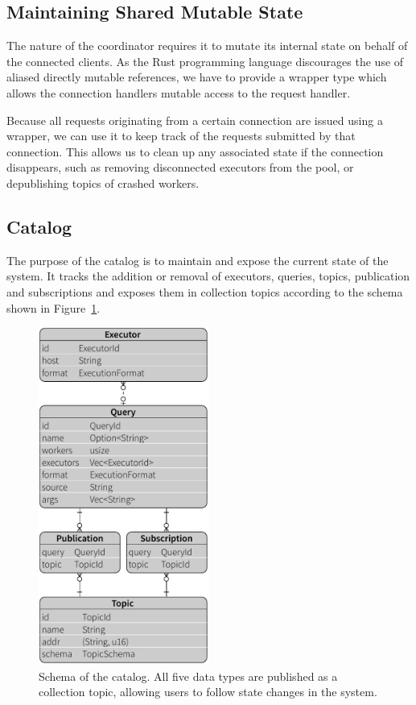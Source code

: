 \subsection{Maintaining Shared Mutable State}

The nature of the coordinator requires it to mutate its internal state on
behalf of the connected clients. As the Rust programming language discourages
the use of aliased directly mutable references, we have to provide a wrapper
type which allows the connection handlers mutable access to the request handler.

Because all requests originating from a certain connection are issued using a
wrapper, we can use it to keep track of the requests submitted by that connection.
This allows us to clean up any associated state if the connection disappears,
such as removing disconnected executors from the pool, or depublishing 
topics of crashed workers.

\subsection{Catalog}

The purpose of the catalog is to maintain and expose the current state of the
system. It tracks the addition or removal of executors, queries, topics,
publication and subscriptions and exposes them in collection topics according
to the schema shown in Figure~\ref{fig:model}.

\begin{figure}[htb]
  \centering
    \includegraphics[width=0.5\textwidth]{figures/model}
  \caption[Schema of the catalog.]{Schema of the catalog. All five data types
  are published as a collection topic, allowing users to follow state changes
  in the system.}
  \label{fig:model}
\end{figure}


